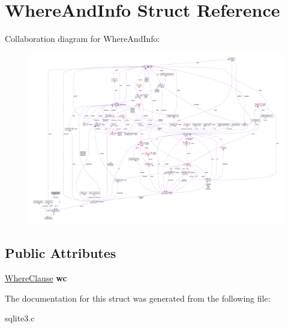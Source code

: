 \hypertarget{struct_where_and_info}{\section{Where\-And\-Info Struct Reference}
\label{struct_where_and_info}
}


Collaboration diagram for Where\-And\-Info\-:\nopagebreak
\begin{figure}[H]
\begin{center}
\leavevmode
\includegraphics[width=350pt]{struct_where_and_info__coll__graph}
\end{center}
\end{figure}
\subsection*{Public Attributes}
\begin{DoxyCompactItemize}
\item 
\hypertarget{struct_where_and_info_a01cea99f069b1e598004a1cd0d0c3a80}{\hyperlink{struct_where_clause}{Where\-Clause} {\bfseries wc}}\label{struct_where_and_info_a01cea99f069b1e598004a1cd0d0c3a80}

\end{DoxyCompactItemize}


The documentation for this struct was generated from the following file\-:\begin{DoxyCompactItemize}
\item 
sqlite3.\-c\end{DoxyCompactItemize}
